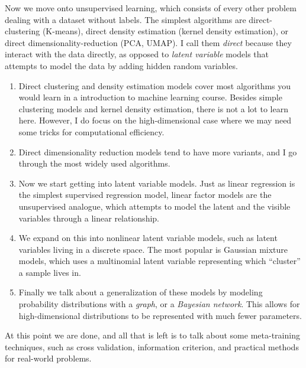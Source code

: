 Now we move onto unsupervised learning, which consists of every other problem dealing with a dataset without labels. The simplest algorithms are direct-clustering (K-means), direct density estimation (kernel density estimation), or direct dimensionality-reduction (PCA, UMAP). I call them \textit{direct} because they interact with the data directly, as opposed to \textit{latent variable} models that attempts to model the data by adding hidden random variables. 
\begin{enumerate}
  \item Direct clustering and density estimation models cover most algorithms you would learn in a introduction to machine learning course. Besides simple clustering models and kernel density estimation, there is not a lot to learn here. However, I do focus on the high-dimensional case where we may need some tricks for computational efficiency. 

  \item Direct dimensionality reduction models tend to have more variants, and I go through the most widely used algorithms. 

  \item Now we start getting into latent variable models. Just as linear regression is the simplest supervised regression model, linear factor models are the unsupervised analogue, which attempts to model the latent and the visible variables through a linear relationship.   

  \item We expand on this into nonlinear latent variable models, such as latent variables living in a discrete space. The most popular is Gaussian mixture models, which uses a multinomial latent variable representing which ``cluster'' a sample lives in. 

  \item Finally we talk about a generalization of these models by modeling probability distributions with a \textit{graph}, or a \textit{Bayesian network}. This allows for high-dimensional distributions to be represented with much fewer parameters. 
\end{enumerate}

At this point we are done, and all that is left is to talk about some meta-training techniques, such as cross validation, information criterion, and practical methods for real-world problems. 

